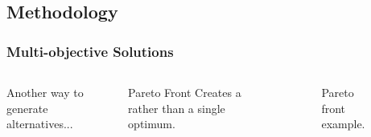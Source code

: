 \subsection{Methodology}
\begin{frame}
    \frametitle{Multi-objective Solutions}
    \begin{columns}
        \column[t]{4cm}
        \begin{block}{}
            Another way to generate alternatives...
        \end{block}
        \begin{block}{Pareto Front}
            Creates a  rather than a single optimum.
        \end{block}
        \column[t]{6cm}
        \begin{figure}
            \centering
            \resizebox{\columnwidth}{!}{}
            \caption{Pareto front example.}
            \label{fig:pareto-front}
        \end{figure}
    
    \end{columns}
    
\end{frame}

